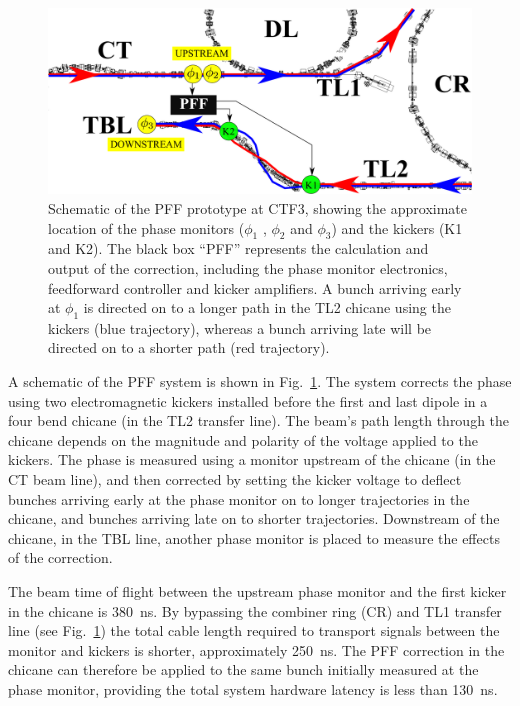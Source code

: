 \documentclass[%
 reprint,
 amsmath,amssymb,
 prl,
]{revtex4-1}
\begin{document}
\begin{figure}
	\includegraphics[width=\textwidth]{figs/ctfpffLayout}%
	\caption{\label{fig:pffLayout}Schematic of the PFF prototype at CTF3, 
	showing the approximate location of the phase monitors (\(\phi_1\) , 
	\(\phi_2\) and \(\phi_3\)) and
		the kickers (K1 and K2). The black box “PFF” represents the calculation 
		and output of the correction, including the phase monitor
		electronics, feedforward controller and kicker amplifiers. A bunch 
		arriving early at \(\phi_1\) is directed on to a longer path in the TL2 
		chicane
		using the kickers (blue trajectory), whereas a bunch arriving late will 
		be directed on to a shorter path (red trajectory). }
\end{figure}

A schematic of the PFF system is shown in Fig.~\ref{fig:pffLayout}. The system 
corrects the phase using two electromagnetic kickers installed 
before the first and last dipole in a four bend chicane (in the TL2 transfer 
line). The beam's path length 
through the chicane depends on the magnitude and polarity of the voltage 
applied to the kickers. The phase is measured using a monitor upstream of 
the chicane (in the CT beam line), and then corrected by setting the kicker 
voltage to deflect bunches arriving early at the phase monitor on to longer 
trajectories in the chicane, and bunches arriving late on to shorter 
trajectories. Downstream of the chicane, in the TBL line, another phase monitor 
is placed to measure the effects of the correction.

The beam time of flight between the upstream phase monitor and the first kicker 
in the chicane is 380~ns. By bypassing the combiner ring (CR) and TL1 transfer 
line (see Fig.~\ref{fig:pffLayout}) the total cable length required to 
transport signals between the monitor and kickers is shorter, approximately 
250~ns. The PFF correction in the chicane can therefore be applied to the same 
bunch initially measured at the phase monitor, providing the total system 
hardware latency is less than 130~ns. 
\end{document}
